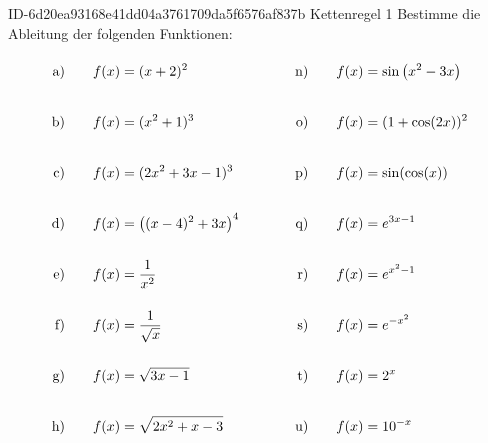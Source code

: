 \begin{exercise}
      {ID-6d20ea93168e41dd04a3761709da5f6576af837b}
      {Kettenregel 1}
  \ifproblem\problem
    Bestimme die Ableitung der folgenden Funktionen:
    \begingroup
      \newcommand{\vstrut}{\rule[-3.5ex]{0pt}{7.5ex}}%
      \newcommand{\xca}{f(x)&=(x+2)^{2}}%
      \newcommand{\xcb}{f(x)&=(x^{2}+1)^{3}}%
      \newcommand{\xcc}{f(x)&=(2x^{2}+3x-1)^{3}}%
      \newcommand{\xcd}{f(x)&=\left((x-4)^{2}+3x\right)^{4}}%
      \newcommand{\xce}{f(x)&=\frac{1}{x^{2}}}%
      \newcommand{\xcf}{f(x)&=\frac{1}{\sqrt{x}}}%
      \newcommand{\xcg}{f(x)&=\sqrt{3x-1}}%
      \newcommand{\xch}{f(x)&=\sqrt{2x^{2}+x-3}}%
      \newcommand{\xci}{f(x)&=\sqrt{x^{3}}}%
      \newcommand{\xcj}{f(x)&=\sqrt{\sqrt[3]{x}}}%
      \newcommand{\xck}{f(x)&=-\cos(5x)}%
      \newcommand{\xcl}{f(x)&=\sin\left(\frac{\pi}{2}-x\right)}%
      \newcommand{\xcm}{f(x)&=\cos\left(x^{3}+1\right)}%
      \newcommand{\xcn}{f(x)&=\sin\left(x^{2}-3x\right)}%
      \newcommand{\xco}{f(x)&=(1+\cos(2x))^{2}}%
      \newcommand{\xcp}{f(x)&=\sin(\cos(x))}%
      \newcommand{\xcq}{f(x)&=e^{3x-1}}%
      \newcommand{\xcr}{f(x)&=e^{x^{2}-1}}%
      \newcommand{\xcs}{f(x)&=e^{-x^{2}}}%
      \newcommand{\xct}{f(x)&=2^{x}}%
      \newcommand{\xcu}{f(x)&=10^{-x}}%
      \newcommand{\xcv}{f(x)&=k_{0}\cdot\left(1+\frac{p}{100}\right)^{x}}%
      \newcommand{\xcw}{f(x)&=\ln\left(x^{2}+3\right)}%
      \newcommand{\xcx}{f(x)&=\ln(\sin(x)+2)}%
      \newcommand{\xcy}{f(x)&=\log_{2}(3x+1)}%
      \newcommand{\xcz}{f(x)&=\ln(\ln(x))}%
      \allowdisplaybreaks
      \begin{alignat*}{5}
        \text{a)\vstrut}&\quad & \xca & \quad&\quad & \text{n)\vstrut}&\quad & \xcn \\
        \text{b)\vstrut}&\quad & \xcb & \quad&\quad & \text{o)\vstrut}&\quad & \xco \\
        \text{c)\vstrut}&\quad & \xcc & \quad&\quad & \text{p)\vstrut}&\quad & \xcp \\
        \text{d)\vstrut}&\quad & \xcd & \quad&\quad & \text{q)\vstrut}&\quad & \xcq \\
        \text{e)\vstrut}&\quad & \xce & \quad&\quad & \text{r)\vstrut}&\quad & \xcr \\
        \text{f)\vstrut}&\quad & \xcf & \quad&\quad & \text{s)\vstrut}&\quad & \xcs \\
        \text{g)\vstrut}&\quad & \xcg & \quad&\quad & \text{t)\vstrut}&\quad & \xct \\
        \text{h)\vstrut}&\quad & \xch & \quad&\quad & \text{u)\vstrut}&\quad & \xcu \\

\end{alignat*}
\end{exercise}
